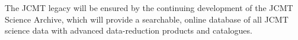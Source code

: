 \documentclass[]{spie}  %
\begin{document}
The JCMT legacy will be ensured by the continuing development of the
JCMT Science Archive,\cite{jsahistory} which will provide a searchable,
online database of all JCMT science data with advanced data-reduction
products and catalogues.\cite{2014SPIE9152-93}

\acknowledgments     %



\end{document}
